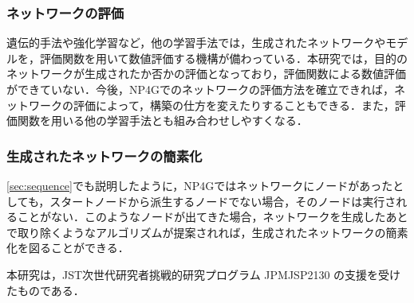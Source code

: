 \documentclass[exploratorypaper]{jsaiart} %
\begin{document}
\subsubsection{ネットワークの評価}
遺伝的手法や強化学習など，他の学習手法では，生成されたネットワークやモデルを，評価関数を用いて数値評価する機構が備わっている．本研究では，目的のネットワークが生成されたか否かの評価となっており，評価関数による数値評価ができていない．今後，NP4Gでのネットワークの評価方法を確立できれば，ネットワークの評価によって，構築の仕方を変えたりすることもできる．また，評価関数を用いる他の学習手法とも組み合わせしやすくなる．
\subsubsection{生成されたネットワークの簡素化}
\ref{sec:sequence}でも説明したように，NP4Gではネットワークにノードがあったとしても，スタートノードから派生するノードでない場合，そのノードは実行されることがない．このようなノードが出てきた場合，ネットワークを生成したあとで取り除くようなアルゴリズムが提案されれば，生成されたネットワークの簡素化を図ることができる．
\begin{acknowledgment}
本研究は，JST次世代研究者挑戦的研究プログラム JPMJSP2130 の支援を受けたものである．
\end{acknowledgment}





\begin{biography}
\end{biography}
\end{document}
